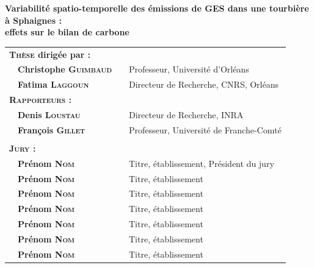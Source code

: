 {%
\vfill

\begin{framed}
	\begin{minipage}{\dimexpr\textwidth-2\fboxrule-2\fboxsep}
	\centering
		\vspace{0.2cm}
			{\Large\textbf{Variabilité spatio-temporelle des émissions de GES dans une tourbière à Sphaignes : \\effets sur le bilan de carbone}\\ \vspace{0.3cm}
			}
		\vspace{0.2cm}
	\end{minipage}
\end{framed}

} %

\vfill

\begin{center}
\begin{tabular}{l l l l}
\multicolumn{2}{l}{\textbf{\textsc{Thèse} dirig\'ee par : }} & & \\[.5ex]
	& \textbf{Christophe \textsc{Guimbaud}} &  &  Professeur, Université d'Orléans\\
	& \textbf{Fatima \textsc{Laggoun}} & &  Directeur de Recherche, CNRS, Orléans\\[1ex]
\multicolumn{2}{l}{\textsc{\textbf{Rapporteurs :}}} & & \\[.5ex]
	& \textbf{Denis \textsc{Loustau}} & &  Directeur de Recherche, INRA\\
	& \textbf{François \textsc{Gillet}} & &  Professeur, Université de Franche-Comté\\[1ex]
\hline\\ [-1ex]
\multicolumn{2}{l}{\textsc{\textbf{Jury : }}} & &\\[.5ex]
	&\textbf{Pr\'enom \textsc{Nom}} &  & Titre, \'etablissement, Pr\'esident du jury\\
	&\textbf{Pr\'enom \textsc{Nom}} &  &  Titre, \'etablissement\\
	&\textbf{Pr\'enom \textsc{Nom}} &  &  Titre, \'etablissement\\
	&\textbf{Pr\'enom \textsc{Nom}} &  &  Titre, \'etablissement\\
	&\textbf{Pr\'enom \textsc{Nom}} &  &  Titre, \'etablissement\\
	&\textbf{Pr\'enom \textsc{Nom}} &  &  Titre, \'etablissement\\
	&\textbf{Pr\'enom \textsc{Nom}} &  &  Titre, \'etablissement\\
\end{tabular}
\end{center}

\vfill

\restoregeometry %
